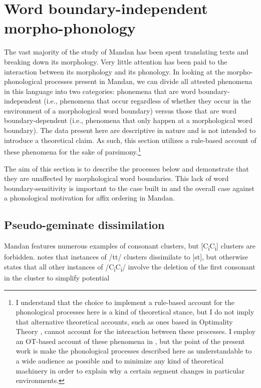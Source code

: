 \section{Word boundary-independent morpho-phonology}\label{boundaryindependent}
\largerpage
The vast majority of the study of Mandan has been spent translating texts and breaking down its morphology. Very little attention has been paid to the interaction between its morphology and its phonology. In looking at the morpho-phonological processes present in Mandan, we can divide all attested phenomena in this language into two categories: phonemena that are word boundary-independent (i.e., phenomena that occur regardless of whether they occur in the environment of a morphological word boundary) versus those that are word boundary-dependent (i.e., phenomena that only happen at a morphological word boundary). The data present here are descriptive in nature and is not intended to introduce a theoretical claim. As such, this section utilizes a rule-based account of these phenomena for the sake of parsimony.\footnote{I understand that the choice to implement a rule-based account for the phonological processes here is a kind of theoretical stance, but I do not imply that alternative theoretical accounts, such as ones based in Optimality Theory \citep{princesmolensky1993}, cannot account for the interaction between these processes. I employ an OT-based account of these phenomena in \citet{kasak2019}, but the point of the present work is make the phonological processes described here as understandable to a wide audience as possible and to minimize any kind of theoretical machinery in order to explain why a certain segment changes in particular environments.}

The aim of this section is to describe the processes below and demonstrate that they are unaffected by morphological word boundaries. This lack of word boundary-sensitivity is important to the case built in  and the overall case against a phonological motivation for affix ordering in Mandan.

\subsection{Pseudo-geminate dissimilation}\label{geminatedissimilation}

Mandan features numerous examples of consonant clusters, but [C\textsubscript{i}C\textsubscript{i}] clusters are forbidden. \citet[37]{hollow1970} notes that instances of /tt/ clusters dissimilate to [st], but otherwise states that all other instances of /C\textsubscript{i}C\textsubscript{i}/ involve the deletion of the first consonant in the cluster to simplify potential

